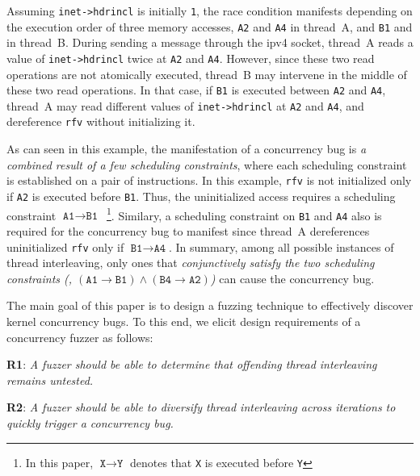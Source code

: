 Assuming \texttt{inet->hdrincl} is initially \texttt{1}, the race
condition manifests depending on the execution order of three memory
accesses, \texttt{A2} and \texttt{A4} in thread~A, and \texttt{B1} and
in thread~B.
%
During sending a message through the ipv4 socket, thread~A reads a
value of \texttt{inet->hdrincl} twice at \texttt{A2} and \texttt{A4}.
%
However, since these two read operations are not atomically executed,
thread~B may intervene in the middle of these two read operations.
%
In that case, if \texttt{B1} is executed between \texttt{A2} and
\texttt{A4}, thread~A may read different values of
\texttt{inet->hdrincl} at \texttt{A2} and \texttt{A4}, and dereference
\texttt{rfv} without initializing it.


%
As can seen in this example, the manifestation of a concurrency bug is
\textit{a combined result of a few scheduling constraints}, where each
scheduling constraint is established on a pair of instructions.
%
In this example, \texttt{rfv} is not initialized only if \texttt{A2}
is executed before \texttt{B1}. Thus, the uninitialized access
requires a scheduling constraint
$\texttt{A1} \rightarrow \texttt{B1}$~\footnote{In this paper,
  $\texttt{X} \rightarrow \texttt{Y}$ denotes that \texttt{X} is
  executed before \texttt{Y}}.
%
Similary, a scheduling constraint on \texttt{B1} and \texttt{A4} also
is required for the concurrency bug to manifest since thread~A
dereferences uninitialized \texttt{rfv} only if
$\texttt{B1} \rightarrow \texttt{A4}$.
%
In summary, among all possible instances of thread interleaving, only
ones that \textit{conjunctively satisfy the two scheduling constraints
  (\ie,
  $(\texttt{A1} \rightarrow \texttt{B1}) \wedge (\texttt{B4}
  \rightarrow \texttt{A2})$)} can cause the concurrency bug.

%
%
%
The main goal of this paper is to design a fuzzing technique to
effectively discover kernel concurrency bugs. To this end, we elicit
design requirements of a concurrency fuzzer as follows:

\vspace{0.4em}
%
\textbf{R1}: \emph{A fuzzer should be able to determine that offending
  thread interleaving remains untested.}

\textbf{R2}: \emph{A fuzzer should be able to diversify thread
  interleaving across iterations to quickly trigger a concurrency
  bug.}
%
\vspace{0.2em}

